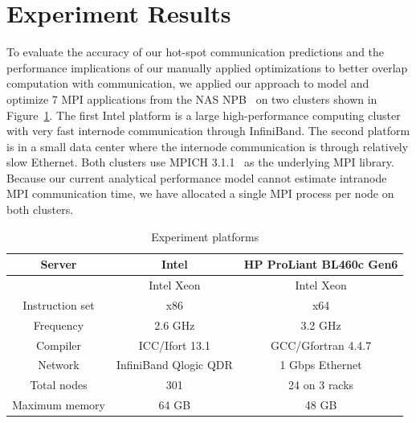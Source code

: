 
\section{Experiment Results}
\label{sec-exp}
To evaluate the accuracy of our hot-spot communication predictions
  and the performance implications of our manually applied optimizations to better overlap computation with communication,
we applied our approach to model and optimize 7 MPI applications from the NAS NPB~\cite{npb}
  on two clusters shown in Figure~\ref{tab:hw}.
The first Intel platform is a large high-performance computing cluster with very fast internode communication through InfiniBand.
  The second platform is in a small data center where the internode communication is through relatively slow Ethernet.
Both clusters use MPICH 3.1.1~\cite{mpich2} as the underlying MPI library.
Because our current analytical performance model cannot estimate intranode MPI communication time,
  we have allocated a single MPI process per node on both clusters.
\begin{table}
\caption{Experiment platforms}
\begin{center}
\begin{tabular}{c|c c}
\hline
Server & Intel & HP ProLiant BL460c Gen6 \\
\hline
          &  Intel Xeon & Intel Xeon \\
Instruction set  &  x86 & x64 \\
Frequency &  2.6 GHz & 3.2 GHz \\
Compiler  &  ICC/Ifort 13.1 & GCC/Gfortran 4.4.7 \\
Network   &  InfiniBand Qlogic QDR & 1 Gbps Ethernet \\
Total nodes &  301 & 24 on 3 racks\\
Maximum memory &  64 GB & 48 GB \\
\hline
\hline
\end{tabular}
\end{center}
\label{tab:hw}
\end{table}

